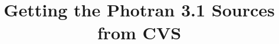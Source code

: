 \documentclass[10pt,letterpaper]{article}
\begin{document}
\title{Getting the Photran 3.1 Sources from CVS}
\author{}
\date{}

\maketitle


\end{document}
